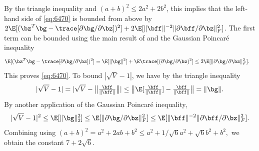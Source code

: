 \documentclass{colt2022} %
\renewenvironment{proof}[1][]
{
    \begin{newproof}
    \ifthenelse{\equal{#1}{}}{ }{\textbf{(#1) }}%
}{
    \end{newproof}
}
\numberwithin{equation}{section}
\begin{document}
\begin{proof}
    By the triangle inequality 
    and $(a+b)^2\le 2a^2 + 2b^2$,
    this implies that the left-hand side of \eqref{eq:6470}
    is bounded from above by
    $
    2\E[(\bz^T \bg - \trace[ \partial \bg / \partial \bz ])^2]
    +
    2\E[\|\bff\|^{-2}\|\partial \bff / \partial \bz \|_{F}^{2}]$.
    The first term can be bounded using the main result
    of \cite{bellec_zhang2018second_stein}
    and the Gaussian Poincar\'e inequality
    \cite[Theorem 3.20]{boucheron2013concentration}
    \begin{align}
        \E[(\bz^T \bg - \trace[ \partial \bg / \partial \bz ])^2]
         &=  
         \E[\|\bg\|^2]  + \E\trace[(\partial \bg / \partial \bz)^2]
         \le 
         2 \E[\| \partial \bg / \partial \bz \|_F^2].
         \nonumber
    \end{align}
    This proves
    \eqref{eq:6470}.
    To bound $|\sqrt{V} - 1|$, we have by the triangle inequality
    $$
    |\sqrt{V} - 1|
    =
    |\sqrt{V} - \bigl\| \tfrac{\bff}{ \| \bff \|} \bigr\| |
    \le
    \big\|\E[\tfrac{ \bff}{ \| \bff \|}] - \tfrac{\bff}{\|\bff\|} \big\|
    =
    \| \bg \|.
    $$
    By another application of the Gaussian Poincar\'e inequality,
    \begin{equation}
        \label{eq:8507}
        |\sqrt{V} - 1|^2
        \leq
        \E[\| \bg \|_{2}^{2}]
        \leq
        \E[\| \partial \bg / \partial \bz \|_F^2]
        \leq
        \E[\| \bff \|^{-2}\| \partial \bff / \partial \bz \|_F^2].
    \end{equation}
    Combining  using 
    $ 
        (a + b)^{2} = a^{2} + 2 ab  + b^{2} \leq a^{2} + 1 / \sqrt{6} a^{2} + \sqrt{6} b^{2} + b^{2},
    $
    we obtain the constant $ 7 + 2 \sqrt{6}$.

\end{proof}
\end{document}
